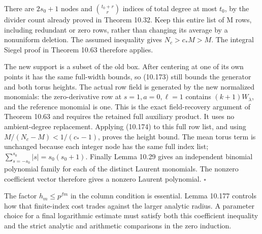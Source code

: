 \documentclass[
  11pt,
  a4paper,
]{article}
\begin{document}
There are \(2s_0+1\) nodes and \(\binom{t_0+r}{r}\) indices of total
degree at most \(t_0\), by the divider count already proved in Theorem
10.32. Keep this entire list of M rows, including redundant or zero
rows, rather than changing its average by a nonuniform deletion. The
assumed inequality gives \(N_c>c_*M>M\). The integral Siegel proof in
Theorem 10.63 therefore applies.

The new support is a subset of the old box. After centering at one of
its own points it has the same full-width bounds, so (10.173) still
bounds the generator and both torus heights. The actual row field is
generated by the new normalized monomials: the zero-derivative row at
\(s=1,a=0,\ell=1\) contains \((k+1)W_\lambda\), and the reference
monomial is one. This is the exact field-recovery argument of Theorem
10.63 and requires the retained full auxiliary product. It uses no
ambient-degree replacement. Applying (10.174) to this full row list, and
using \(M/(N_c-M)<1/(c_*-1)\), proves the height bound. The mean torus
term is unchanged because each integer node has the same full index
list; \(\sum_{s=-s_0}^{s_0}|s|=s_0(s_0+1)\). Finally Lemma 10.29 gives
an independent binomial polynomial family for each of the distinct
Laurent monomials. The nonzero coefficient vector therefore gives a
nonzero Laurent polynomial. \(\square\)

The factor \(h_m\le p^{fm}\) in the column condition is essential. Lemma
10.177 controls how that finite-index cost trades against the larger
analytic radius. A parameter choice for a final logarithmic estimate
must satisfy both this coefficient inequality and the strict analytic
and arithmetic comparisons in the zero induction.
\end{document}
